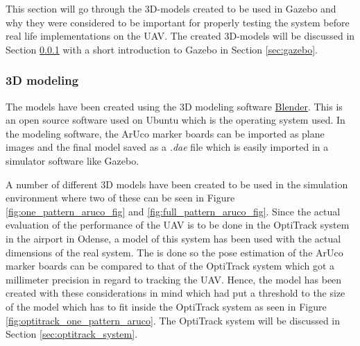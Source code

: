 \documentclass[../Head/report.tex]{subfiles}
\begin{document}
This section will go through the 3D-models created to be used in Gazebo and why they were considered to be important for properly testing the system before real life implementations on the UAV. The created 3D-models will be discussed in Section \ref{sec:3d_modeling} with a short introduction to Gazebo in Section \ref{sec:gazebo}.

\subsubsection{3D modeling}
\label{sec:3d_modeling}

The models have been created using the 3D modeling software \href{https://www.blender.org/}{Blender}. This is an open source software used on Ubuntu which is the operating system used. In the modeling software, the ArUco marker boards can be imported as plane images and the final model saved as a \textit{.dae} file which is easily imported in a simulator software like Gazebo.    

A number of different 3D models have been created to be used in the simulation environment where two of these can be seen in Figure \ref{fig:one_pattern_aruco_fig} and \ref{fig:full_pattern_aruco_fig}. Since the actual evaluation of the performance of the UAV is to be done in the OptiTrack system in the airport in Odense, a model of this system has been used with the actual dimensions of the real system. The is done so the pose estimation of the ArUco marker boards can be compared to that of the OptiTrack system which got a millimeter precision in regard to tracking the UAV. Hence, the model has been created with these considerations in mind which had put a threshold to the size of the model which has to fit inside the OptiTrack system as seen in Figure \ref{fig:optitrack_one_pattern_aruco}. The OptiTrack system will be discussed in Section \ref{sec:optitrack_system}.
\end{document}
